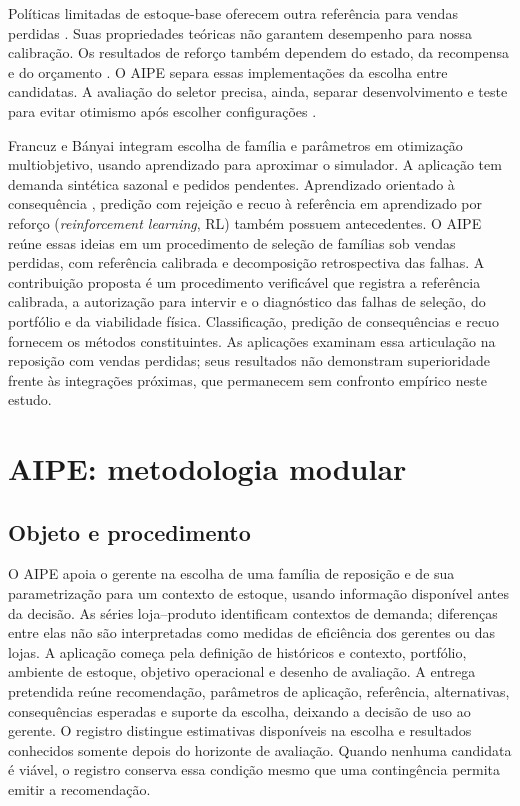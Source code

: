 \documentclass[preprint,12pt]{elsarticle}
\begin{document}
Políticas limitadas de estoque-base oferecem outra referência para vendas perdidas \cite{Xin2021CappedBaseStock}. Suas propriedades teóricas não garantem desempenho para nossa calibração. Os resultados de reforço também dependem do estado, da recompensa e do orçamento \cite{Boute2022DRLInventoryRoadmap}. O AIPE separa essas implementações da escolha entre candidatas. A avaliação do seletor precisa, ainda, separar desenvolvimento e teste para evitar otimismo após escolher configurações \cite{CawleyTalbot2010}.

Francuz e Bányai \cite{FrancuzBanyai2026Selection} integram escolha de família e parâmetros em otimização multiobjetivo, usando aprendizado para aproximar o simulador. A aplicação tem demanda sintética sazonal e pedidos pendentes. Aprendizado orientado à consequência \cite{ElmachtoubGrigas2022SPO}, predição com rejeição \cite{GeifmanElYaniv2019SelectiveNet} e recuo à referência em aprendizado por reforço (\textit{reinforcement learning}, RL) \cite{Laroche2019SPIBB} também possuem antecedentes. O AIPE reúne essas ideias em um procedimento de seleção de famílias sob vendas perdidas, com referência calibrada e decomposição retrospectiva das falhas. A contribuição proposta é um procedimento verificável que registra a referência calibrada, a autorização para intervir e o diagnóstico das falhas de seleção, do portfólio e da viabilidade física. Classificação, predição de consequências e recuo fornecem os métodos constituintes. As aplicações examinam essa articulação na reposição com vendas perdidas; seus resultados não demonstram superioridade frente às integrações próximas, que permanecem sem confronto empírico neste estudo.

\section{AIPE: metodologia modular}
\subsection{Objeto e procedimento}
O AIPE apoia o gerente na escolha de uma família de reposição e de sua parametrização para um contexto de estoque, usando informação disponível antes da decisão. As séries loja--produto identificam contextos de demanda; diferenças entre elas não são interpretadas como medidas de eficiência dos gerentes ou das lojas. A aplicação começa pela definição de históricos e contexto, portfólio, ambiente de estoque, objetivo operacional e desenho de avaliação. A entrega pretendida reúne recomendação, parâmetros de aplicação, referência, alternativas, consequências esperadas e suporte da escolha, deixando a decisão de uso ao gerente. O registro distingue estimativas disponíveis na escolha e resultados conhecidos somente depois do horizonte de avaliação. Quando nenhuma candidata é viável, o registro conserva essa condição mesmo que uma contingência permita emitir a recomendação.
\end{document}
